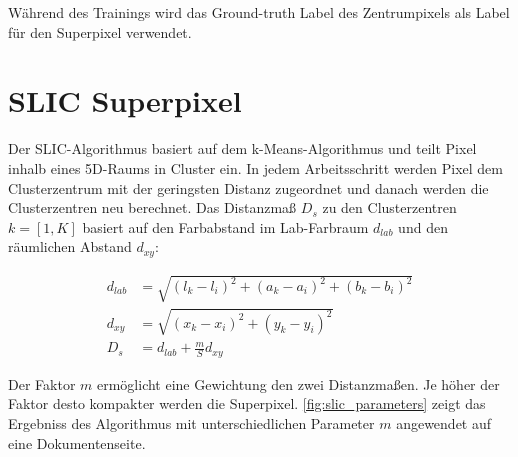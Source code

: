 Während des Trainings wird das Ground-truth Label des Zentrumpixels als Label für den Superpixel verwendet.

\section{SLIC Superpixel}
Der SLIC-Algorithmus basiert auf dem k-Means-Algorithmus und teilt Pixel inhalb eines 5D-Raums in Cluster ein. 
In jedem Arbeitsschritt werden Pixel dem Clusterzentrum mit der geringsten Distanz zugeordnet und danach werden die Clusterzentren neu berechnet.
Das Distanzmaß \(D_s\) zu den Clusterzentren \(k=[1,K]\) basiert auf den Farbabstand im Lab-Farbraum \(d_{lab}\) und den räumlichen Abstand \(d_{xy}\):

\begin{align}
    d_{lab} &= \sqrt{ \left( l_k - l_i \right)^2 + \left( a_k - a_i \right)^2 + \left( b_k - b_i \right)^2 }\\
    d_{xy}  &= \sqrt{ \left( x_k - x_i \right)^2 + \left(y_k - y_i \right)^2 }\\
    D_{s}   &= d_{lab} + \frac{m}{S} d_{xy}
\end{align}

Der Faktor \(m\) ermöglicht eine Gewichtung den zwei Distanzmaßen. Je höher
der Faktor desto kompakter werden die Superpixel. \cref{fig:slic_parameters}
zeigt das Ergebniss des Algorithmus mit unterschiedlichen Parameter  \(m\)
angewendet auf eine Dokumentenseite.

